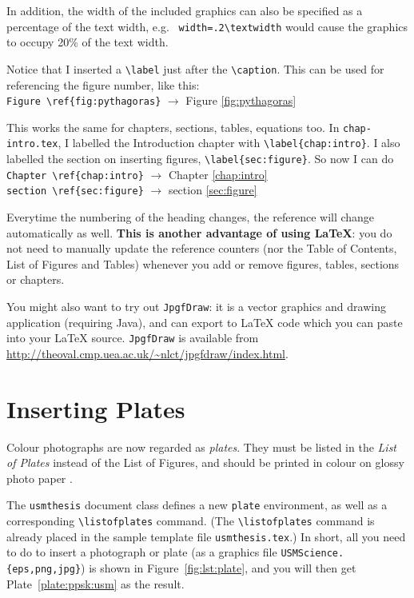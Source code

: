 In addition, the width of the included graphics can also be specified as a percentage of the text width, e.g.~ \verb|width=.2\textwidth| would cause the graphics to occupy 20\% of the text width.

Notice that I inserted a \verb|\label| just after the \verb|\caption|.  This can be used for referencing the figure number, like this: \\
\verb|Figure \ref{fig:pythagoras}| $\to$ Figure \ref{fig:pythagoras}

This works the same for chapters, sections, tables, equations too.  In \verb|chap-intro.tex|, I labelled the Introduction chapter with \verb|\label{chap:intro}|.  I also labelled the section on inserting figures, \verb|\label{sec:figure}|.  So now I can do \\
\verb|Chapter \ref{chap:intro}| $\to$  Chapter \ref{chap:intro} \\
\verb|section \ref{sec:figure}| $\to$  section \ref{sec:figure}

Everytime the numbering of the heading changes, the reference will change automatically as well.  \textbf{This is another advantage of using \LaTeX{}}: you do not need to manually update the reference counters (nor the Table of Contents, List of Figures and Tables) whenever you add or remove figures, tables, sections or chapters.

You might also want to try out \texttt{JpgfDraw}: it is a vector graphics and drawing application (requiring Java), and can export to \LaTeX{} code which you can paste into your \LaTeX{} source. \texttt{JpgfDraw} is available from \url{http://theoval.cmp.uea.ac.uk/~nlct/jpgfdraw/index.html}.


\section{Inserting Plates}\label{sec:plate}

Colour photographs are now regarded as \emph{plates}. They must be listed in the \emph{List of Plates} instead of the List of Figures, and should be printed in colour on glossy photo paper \citep{ips:thesis:guideline:2007}.

The \texttt{usmthesis} document class defines a new \texttt{plate} environment, as well as a corresponding \verb|\listofplates| command.  (The \verb|\listofplates| command is already placed in the sample template file \verb|usmthesis.tex|.)  In short, all you need to do to insert a photograph or plate (as a graphics file \verb|USMScience.{eps,png,jpg}|) is shown in Figure~\ref{fig:lst:plate}, and you will then get Plate~\ref{plate:ppsk:usm} as the result.


